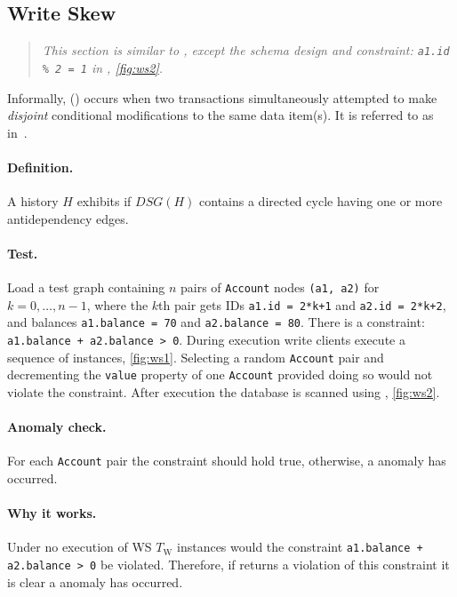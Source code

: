 \subsection{Write Skew}
\label{sec:write-skew}

\begin{quote}
  \textit{This section is similar to \ldbcsnb, except the schema design and 
          constraint: \texttt{a1.id \% 2 = 1} in , \autoref{fig:ws2}.
  }
\end{quote}

Informally,  () occurs when two transactions 
simultaneously attempted to make \emph{disjoint} conditional modifications to 
the same data item(s). It is referred to as  
in~\cite{adya1999weak,DBLP:journals/tods/FeketeLOOS05}.

\paragraph{Definition.}
A history $H$ exhibits  if $\textit{DSG}(H)$ contains a directed 
cycle having one or more antidependency edges.

\paragraph{Test.}
Load a test graph containing $n$ pairs of \texttt{Account} nodes 
\texttt{(a1, a2)} for $k = 0, \ldots, n-1$, where the $k$th pair gets IDs 
\texttt{a1.id = 2*k+1} and \texttt{a2.id = 2*k+2}, and balances 
\texttt{a1.balance = 70} and \texttt{a2.balance = 80}. There is a constraint: 
\texttt{a1.balance + a2.balance > 0}. During execution write clients execute a 
sequence of  instances, \autoref{fig:ws1}. Selecting a 
random \texttt{Account} pair and decrementing the \texttt{value} property of 
one \texttt{Account} provided doing so would not violate the constraint. After
execution the database is scanned using , \autoref{fig:ws2}.

\paragraph{Anomaly check.}
For each \texttt{Account} pair the constraint should hold true, otherwise, a 
 anomaly has occurred.

\paragraph{Why it works.}
Under no  execution of WS $T_\mathrm{W}$ instances would the 
constraint \texttt{a1.balance + a2.balance > 0} be violated. Therefore, if 
 returns a violation of this constraint it is clear a 
 anomaly has occurred.

